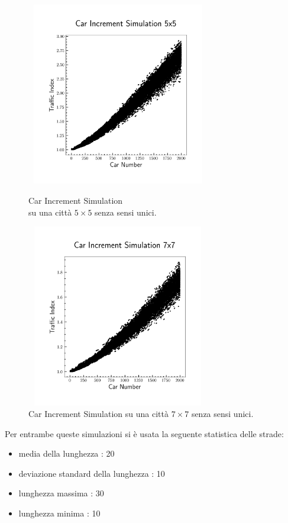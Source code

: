 \documentclass{article}
\begin{document}
        \begin{figure}[H]
            \begin{minipage}{.5\textwidth}
                \centering
                \includegraphics[width=8cm, height=8cm]{car_increment5x5.png}
                \caption{Car Increment Simulation\\ su una città $5 \times 5$ senza sensi unici.}
                \label{fig:3}
            \end{minipage}
            \begin{minipage}{.5\textwidth}
                \centering
                \includegraphics[width=8cm, height=8cm]{car_increment7x7.png}
                \caption{Car Increment Simulation su una città $7 \times 7$ senza sensi unici.}
                \label{fig:4}
            \end{minipage}
        \end{figure}

        Per entrambe queste simulazioni si è usata la seguente statistica delle strade:
        \begin{itemize}
            \item media della lunghezza : 20
            \item deviazione standard della lunghezza : 10
            \item lunghezza massima : 30
            \item lunghezza minima : 10
        \end{itemize}
\end{document}
